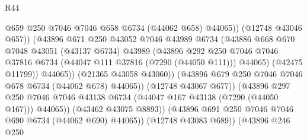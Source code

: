 \begin{lexlean}{R44}
\begin{coremodule}
{                                            @659
                                            @250
                                            @7046
                                            @7046
                                            @658
                                            @6734
                                            (@44062 @658)
                                            @44065))
                                        (@12748 @43046 @657))
                                      (@43896
                                        @671
                                        @250
                                        @43052
                                        @7046
                                        @43989
                                        @6734
                                        (@43886
                                          @668
                                          @670
                                          @7048
                                          @43051
                                          (@43137 @6734)
                                          @43989
                                          (@43896
                                            @292
                                            @250
                                            @7046
                                            @7046
                                            @37816
                                            @6734
                                            (@44047 @111 @37816 (@7290 (@44050 @111)))
                                            @44065)
                                          (@42475 @11799))
                                        @44065))
                                    (@21365 @43058 @43060))
                                  (@43896 @679 @250 @7046 @7046 @678 @6734 (@44062 @678) @44065))
                                (@12748 @43067 @677))
                              (@43896
                                @297
                                @250
                                @7046
                                @7046
                                @43138
                                @6734
                                (@44047 @167 @43138 (@7290 (@44050 @167)))
                                @44065))
                            (@43462 @43075 @8893))
                          (@43896 @691 @250 @7046 @7046 @690 @6734 (@44062 @690) @44065))
                        (@12748 @43083 @689))
                      (@43896
                        @246
                        @250
}
\end{coremodule}
\end{lexlean}
